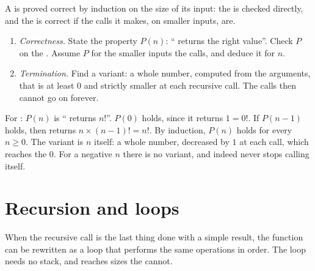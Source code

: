A  is proved correct by induction on the size of its input: the  is checked directly,
and the  is correct if the calls it makes, on smaller inputs, are.

\begin{method}
\begin{enumerate}
  \item \emph{Correctness.} State the property $P(n)$: `` returns the right value''. Check $P$ on the
    . Assume $P$ for the smaller inputs the  calls, and deduce it for $n$.
  \item \emph{Termination.} Find a variant: a whole number, computed from the arguments, that is at least $0$ and
    strictly smaller at each recursive call. The calls then cannot go on forever.
\end{enumerate}
\end{method}

For : $P(n)$ is `` returns $n!$''. $P(0)$ holds, since it returns $1 = 0!$. If
$P(n - 1)$ holds, then  returns $n \times (n - 1)! = n!$. By induction, $P(n)$ holds for every
$n \ge 0$. The variant is $n$ itself: a whole number, decreased by $1$ at each call, which reaches the  $0$.
For a negative $n$ there is no variant, and indeed  never stops calling itself.

\section{Recursion and loops}\label{sec:g12:recursion:loops}

When the recursive call is the last thing done with a simple result, the function can be rewritten as a loop that
performs the same operations in order. The loop needs no stack, and reaches sizes the  cannot.

\label{lst:g12:recursion:loop}

\label{out:g12:recursion:loop}

